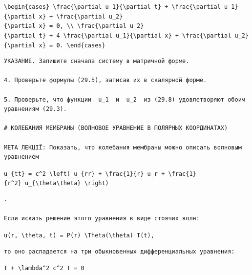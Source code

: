 \documentclass[
  ukrainian,
]{article}
\begin{document}
\texttt{\textbackslash{}begin\{cases\}\ \textbackslash{}frac\{\textbackslash{}partial\ u\_1\}\{\textbackslash{}partial\ t\}\ +\ \textbackslash{}frac\{\textbackslash{}partial\ u\_1\}\{\textbackslash{}partial\ x\}\ +\ \textbackslash{}frac\{\textbackslash{}partial\ u\_2\}\{\textbackslash{}partial\ x\}\ =\ 0,\ \textbackslash{}\textbackslash{}\ \textbackslash{}frac\{\textbackslash{}partial\ u\_2\}\{\textbackslash{}partial\ t\}\ +\ 4\ \textbackslash{}frac\{\textbackslash{}partial\ u\_1\}\{\textbackslash{}partial\ x\}\ +\ \textbackslash{}frac\{\textbackslash{}partial\ u\_2\}\{\textbackslash{}partial\ x\}\ =\ 0.\ \textbackslash{}end\{cases\}}

\begin{verbatim}
УКАЗАНИЕ. Запишите сначала систему в матричной форме.

4. Проверьте формулы (29.5), записав их в скалярной форме.

5. Проверьте, что функции  u_1  и  u_2  из (29.8) удовлетворяют обоим уравнениям (29.3).

# КОЛЕБАНИЯ МЕМБРАНЫ (ВОЛНОВОЕ УРАВНЕНИЕ В ПОЛЯРНЫХ КООРДИНАТАХ)

МЕТА ЛЕКЦІЇ: Показать, что колебания мембраны можно описать волновым уравнением
\end{verbatim}

\texttt{u\_\{tt\}\ =\ c\^{}2\ \textbackslash{}left(\ u\_\{rr\}\ +\ \textbackslash{}frac\{1\}\{r\}\ u\_r\ +\ \textbackslash{}frac\{1\}\{r\^{}2\}\ u\_\{\textbackslash{}theta\textbackslash{}theta\}\ \textbackslash{}right)}

\begin{verbatim}
.

Если искать решение этого уравнения в виде стоячих волн:
\end{verbatim}

\texttt{u(r,\ \textbackslash{}theta,\ t)\ =\ P(r)\ \textbackslash{}Theta(\textbackslash{}theta)\ T(t),}

\begin{verbatim}
то оно распадается на три обыкновенных дифференциальных уравнения:
\end{verbatim}

\texttt{T\textquotesingle{}\textquotesingle{}\ +\ \textbackslash{}lambda\^{}2\ c\^{}2\ T\ =\ 0}
\end{document}
